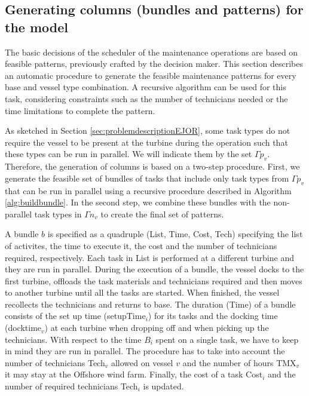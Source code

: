 \subsection{Generating columns (bundles and patterns) for the model}
\label{subsec:buildpatterns}
The basic decisions of the scheduler of the maintenance operations are based on feasible patterns, previously crafted by the decision maker. This section describes an automatic procedure to generate the feasible maintenance patterns for every base and vessel type combination. A recursive algorithm can be used for this task, considering constraints such as the number of technicians needed or the time limitations to complete the pattern.

As sketched in Section \ref{sec:problemdescriptionEJOR}, some task types do not require the vessel to be present at the turbine during the operation such that these types can be run in parallel. We will indicate them by the set $\Gamma p_v$. Therefore, the generation of columns is based on a two-step procedure. First, we generate the feasible set of bundles of tasks that include only task types from $\Gamma p_v$ that can be run in parallel using a recursive procedure described in Algorithm \ref{alg:buildbundle}. In the second step, we combine these bundles with the non-parallel task types in $\Gamma n_v$ to create the final set of patterns.


A bundle $b$ is specified as a quadruple (List, Time, Cost, Tech) specifying the list of activites, the time to execute it, the cost and the number of technicians required, respectively. Each task in List is performed at a different turbine and they are run in parallel. During the execution of a bundle, the vessel docks to the first turbine, offloads the task materials and technicians required and then moves to another turbine until all the tasks are started. When finished, the vessel recollects the technicians and returns to base. The duration (Time) of a bundle consists of the set up time (setupTime$_i$) for its tasks and the docking time (docktime$_v$) at each turbine when dropping off and when picking up the technicians. With respect to the time $B_i$ spent on a single task, we have to keep in mind they are run in parallel. The procedure has to take into account the number of technicians Tech$_v$ allowed on vessel $v$ and the number of hours TMX$_v$ it may stay at the Offshore wind farm. Finally, the cost of a task Cost$_i$ and the number of required technicians Tech$_i$ is updated.

